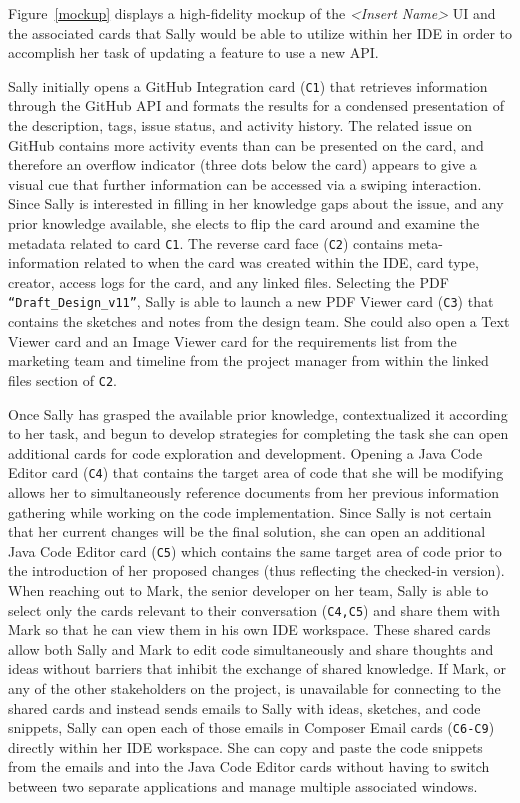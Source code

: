 \documentclass{ppig}
\newcommand{\nameUI}{\textit{<Insert Name>} UI} %
\begin{document}
Figure~\ref{mockup} displays a high-fidelity mockup of the \nameUI{} and the associated cards that Sally would be able to utilize within her IDE in order to accomplish her task of updating a feature to use a new API.

Sally initially opens a GitHub Integration card (\texttt{C1}) that retrieves information through the GitHub API and formats the results for a condensed presentation of the description, tags, issue status, and activity history.
The related issue on GitHub contains more activity events than can be presented on the card, and therefore an overflow indicator (three dots below the card) appears to give a visual cue that further information can be accessed via a swiping interaction.
Since Sally is interested in filling in her knowledge gaps about the issue, and any prior knowledge available, she elects to flip the card around and examine the metadata related to card \texttt{C1}.
The reverse card face (\texttt{C2}) contains meta-information related to when the card was created within the IDE, card type, creator, access logs for the card, and any linked files.
Selecting the PDF \texttt{``Draft\_Design\_v11''}, Sally is able to launch a new PDF Viewer card (\texttt{C3}) that contains the sketches and notes from the design team.
She could also open a Text Viewer card and an Image Viewer card for the requirements list from the marketing team and timeline from the project manager from within the linked files section of \texttt{C2}.

Once Sally has grasped the available prior knowledge, contextualized it according to her task, and begun to develop strategies for completing the task she can open additional cards for code exploration and development.
Opening a Java Code Editor card (\texttt{C4}) that contains the target area of code that she will be modifying allows her to simultaneously reference documents from her previous information gathering while working on the code implementation.
Since Sally is not certain that her current changes will be the final solution, she can open an additional Java Code Editor card (\texttt{C5}) which contains the same target area of code prior to the introduction of her proposed changes (thus reflecting the checked-in version).
When reaching out to Mark, the senior developer on her team, Sally is able to select only the cards relevant to their conversation (\texttt{C4,C5}) and share them with Mark so that he can view them in his own IDE workspace.
These shared cards allow both Sally and Mark to edit code simultaneously and share thoughts and ideas without barriers that inhibit the exchange of shared knowledge.
If Mark, or any of the other stakeholders on the project, is unavailable for connecting to the shared cards and instead sends emails to Sally with ideas, sketches, and code snippets, Sally can open each of those emails in Composer Email cards (\texttt{C6-C9}) directly within her IDE workspace.
She can copy and paste the code snippets from the emails and into the Java Code Editor cards without having to switch between two separate applications and manage multiple associated windows.
\end{document}

